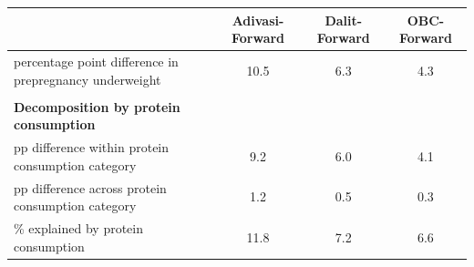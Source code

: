 \begin{tabular}{lccc}
\toprule
 & Adivasi-Forward & Dalit-Forward & OBC-Forward \\
\midrule
percentage point difference in prepregnancy underweight&10.5&6.3&4.3\\
&&&\\
\textbf{Decomposition by protein consumption}&&&\\
pp difference within protein consumption category&9.2&6.0&4.1\\
pp difference across protein consumption category&1.2&0.5&0.3\\
\% explained by protein consumption&11.8&7.2&6.6\\
\bottomrule
\end{tabular}
